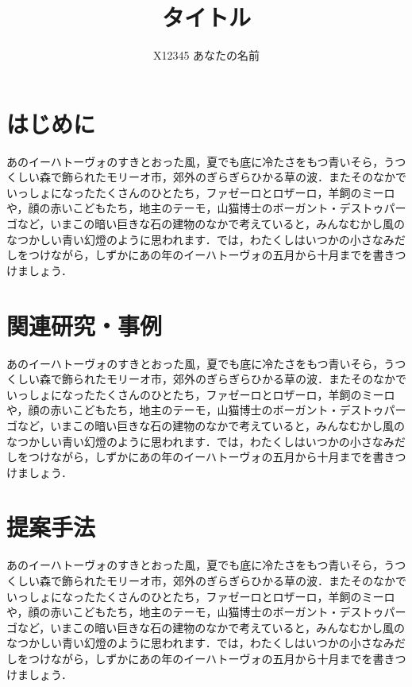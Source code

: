 
\title{タイトル} %

\author{%
    X12345 あなたの名前
}



\maketitle

\section{はじめに}
あのイーハトーヴォのすきとおった風，夏でも底に冷たさをもつ青いそら，うつくしい森で飾られたモリーオ市，郊外のぎらぎらひかる草の波．またそのなかでいっしょになったたくさんのひとたち，ファゼーロとロザーロ，羊飼のミーロや，顔の赤いこどもたち，地主のテーモ，山猫博士のボーガント・デストゥパーゴなど，いまこの暗い巨きな石の建物のなかで考えていると，みんなむかし風のなつかしい青い幻燈のように思われます．では，わたくしはいつかの小さなみだしをつけながら，しずかにあの年のイーハトーヴォの五月から十月までを書きつけましょう．

\section{関連研究・事例}
あのイーハトーヴォのすきとおった風，夏でも底に冷たさをもつ青いそら，うつくしい森で飾られたモリーオ市，郊外のぎらぎらひかる草の波．またそのなかでいっしょになったたくさんのひとたち，ファゼーロとロザーロ，羊飼のミーロや，顔の赤いこどもたち，地主のテーモ，山猫博士のボーガント・デストゥパーゴなど，いまこの暗い巨きな石の建物のなかで考えていると，みんなむかし風のなつかしい青い幻燈のように思われます．では，わたくしはいつかの小さなみだしをつけながら，しずかにあの年のイーハトーヴォの五月から十月までを書きつけましょう．

\section{提案手法}
あのイーハトーヴォのすきとおった風，夏でも底に冷たさをもつ青いそら，うつくしい森で飾られたモリーオ市，郊外のぎらぎらひかる草の波．またそのなかでいっしょになったたくさんのひとたち，ファゼーロとロザーロ，羊飼のミーロや，顔の赤いこどもたち，地主のテーモ，山猫博士のボーガント・デストゥパーゴなど，いまこの暗い巨きな石の建物のなかで考えていると，みんなむかし風のなつかしい青い幻燈のように思われます．では，わたくしはいつかの小さなみだしをつけながら，しずかにあの年のイーハトーヴォの五月から十月までを書きつけましょう．

